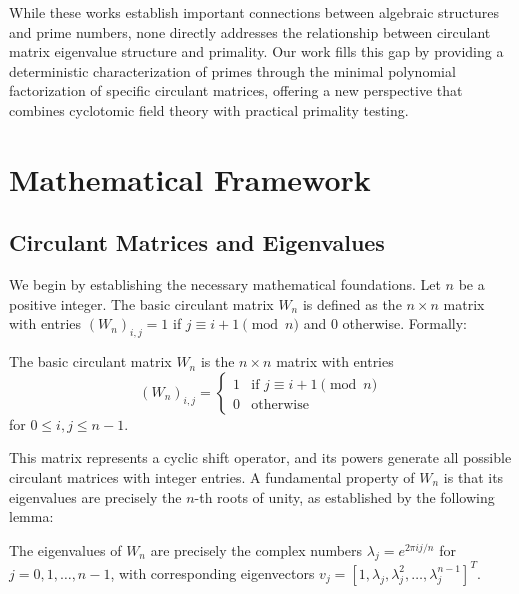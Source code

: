 While these works establish important connections between algebraic structures and prime numbers, none directly addresses the relationship between circulant matrix eigenvalue structure and primality. Our work fills this gap by providing a deterministic characterization of primes through the minimal polynomial factorization of specific circulant matrices, offering a new perspective that combines cyclotomic field theory with practical primality testing.

\section{Mathematical Framework}

\subsection{Circulant Matrices and Eigenvalues}

We begin by establishing the necessary mathematical foundations. Let $n$ be a positive integer. The basic circulant matrix $W_n$ is defined as the $n \times n$ matrix with entries $(W_n)_{i,j} = 1$ if $j \equiv i+1 \pmod{n}$ and $0$ otherwise. Formally:

\begin{definition}
The basic circulant matrix $W_n$ is the $n \times n$ matrix with entries
\[
(W_n)_{i,j} = \begin{cases}
1 & \text{if } j \equiv i+1 \pmod{n}\\
0 & \text{otherwise}
\end{cases}
\]
for $0 \leq i, j \leq n-1$.
\end{definition}

This matrix represents a cyclic shift operator, and its powers generate all possible circulant matrices with integer entries. A fundamental property of $W_n$ is that its eigenvalues are precisely the $n$-th roots of unity, as established by the following lemma:

\begin{lemma}[Eigenvalues of $W_n$]\label{lem:eigenvalues}
The eigenvalues of $W_n$ are precisely the complex numbers $\lambda_j = e^{2\pi i j/n}$ for $j = 0, 1, \ldots, n-1$, with corresponding eigenvectors $v_j = [1, \lambda_j, \lambda_j^2, \ldots, \lambda_j^{n-1}]^T$.
\end{lemma}

